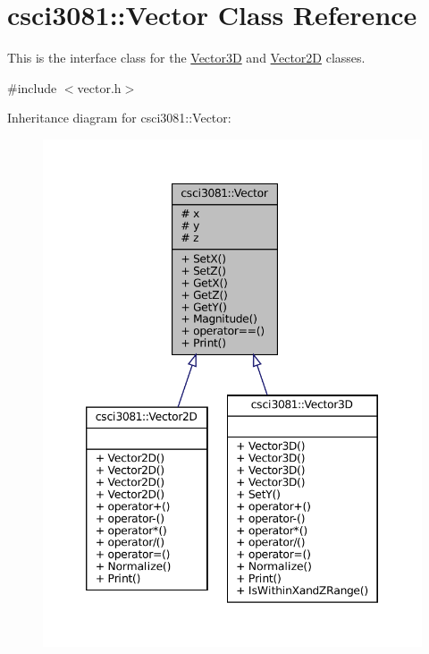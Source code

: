 \hypertarget{classcsci3081_1_1Vector}{}\section{csci3081\+:\+:Vector Class Reference}
\label{classcsci3081_1_1Vector}


This is the interface class for the \hyperlink{classcsci3081_1_1Vector3D}{Vector3D} and \hyperlink{classcsci3081_1_1Vector2D}{Vector2D} classes.  




{\ttfamily \#include $<$vector.\+h$>$}



Inheritance diagram for csci3081\+:\+:Vector\+:
\nopagebreak
\begin{figure}[H]
\begin{center}
\leavevmode
\includegraphics[width=346pt]{classcsci3081_1_1Vector__inherit__graph}
\end{center}
\end{figure}
